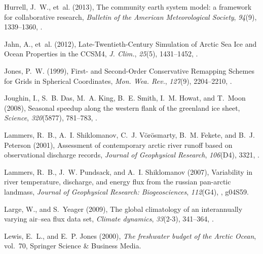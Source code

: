\documentclass[jgrga, draft]{agutex}
\begin{document}
\begin{article}
\begin{thebibliography}{79}
Hurrell, J.~W., et~al. (2013), The community earth system model: a framework
  for collaborative research, \textit{Bulletin of the American Meteorological
  Society}, \textit{94}(9), 1339--1360, .

Jahn, A., et~al. (2012), {Late-Twentieth-Century Simulation of Arctic Sea Ice
  and Ocean Properties in the CCSM4}, \textit{J. Clim.}, \textit{25}(5),
  1431--1452, .

Jones, P.~W. (1999), {First- and Second-Order Conservative Remapping Schemes
  for Grids in Spherical Coordinates}, \textit{Mon. Wea. Rev.},
  \textit{127}(9), 2204--2210, .

Joughin, I., S.~B. Das, M.~A. King, B.~E. Smith, I.~M. Howat, and T.~Moon
  (2008), Seasonal speedup along the western flank of the greenland ice sheet,
  \textit{Science}, \textit{320}(5877), 781--783,
  .

Lammers, R.~B., A.~I. Shiklomanov, C.~J. Vörösmarty, B.~M. Fekete, and B.~J.
  Peterson (2001), Assessment of contemporary arctic river runoff based on
  observational discharge records, \textit{Journal of Geophysical Research},
  \textit{106}(D4), 3321, .

Lammers, R.~B., J.~W. Pundsack, and A.~I. Shiklomanov (2007), Variability in
  river temperature, discharge, and energy flux from the russian pan-arctic
  landmass, \textit{Journal of Geophysical Research: Biogeosciences},
  \textit{112}(G4), , g04S59.

Large, W., and S.~Yeager (2009), The global climatology of an interannually
  varying air--sea flux data set, \textit{Climate dynamics}, \textit{33}(2-3),
  341--364, .

Lewis, E.~L., and E.~P. Jones (2000), \textit{The freshwater budget of the
  Arctic Ocean}, vol.~70, Springer Science \& Business Media.


\end{thebibliography}
\end{article}
\end{document}
